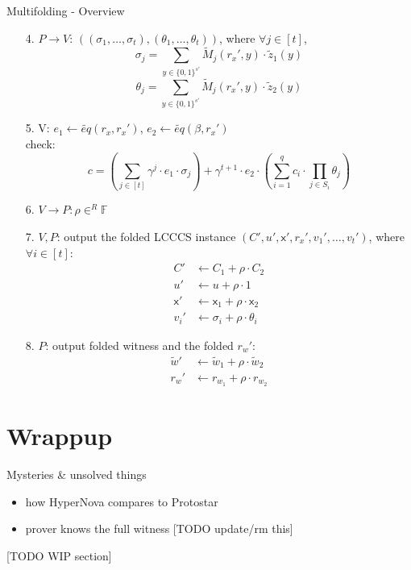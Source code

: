 \documentclass{beamer}
\begin{document}
\begin{frame}{Multifolding - Overview}

  \begin{tiny}
  \begin{enumerate}
    \item[4.] $P \rightarrow V$: $\left( (\sigma_1, \ldots, \sigma_t), (\theta_1, \ldots, \theta_t) \right)$, where $\forall j \in [t]$,
		$$\sigma_j = \sum_{y \in \{0,1\}^{s'}} \widetilde{M}_j(r_x', y) \cdot \widetilde{z}_1(y)$$
		$$\theta_j = \sum_{y \in \{0, 1\}^{s'}} \widetilde{M}_j(r_x', y) \cdot \widetilde{z}_2(y)$$
	      \item[5.] V: $e_1 \leftarrow \widetilde{eq}(r_x, r_x')$, $e_2 \leftarrow \widetilde{eq}(\beta, r_x')$\\
		check:
		$$c = \left(\sum_{j \in [t]} \gamma^j \cdot e_1 \cdot \sigma_j \right) + \gamma^{t+1} \cdot e_2 \cdot \left( \sum_{i=1}^q c_i \cdot \prod_{j \in S_i} \theta_j \right)$$
	      \item[6.] $V \rightarrow P: \rho \in^R \mathbb{F}$
	      \item[7.] $V, P$: output the folded LCCCS instance $(C', u', \mathsf{x}', r_x', v_1', \ldots, v_t')$, where $\forall i \in [t]$:
		\begin{align*}
			C' &\leftarrow C_1 + \rho \cdot C_2\\
			u' &\leftarrow u + \rho \cdot 1\\
			\mathsf{x}' &\leftarrow \mathsf{x}_1 + \rho \cdot \mathsf{x}_2\\
			v_i' &\leftarrow \sigma_i + \rho \cdot \theta_i
		\end{align*}
	      \item[8.] $P$: output folded witness and the folded $r_w'$:
		\begin{align*}
			\widetilde{w}' &\leftarrow \widetilde{w}_1 + \rho \cdot \widetilde{w}_2\\
			r_w' &\leftarrow r_{w_1} + \rho \cdot r_{w_2}
		\end{align*}
  \end{enumerate}
  \end{tiny}

\end{frame}

\section[Wrappup]{Wrappup}

\begin{frame}{Mysteries \& unsolved things}
\begin{itemize}
  \item how HyperNova compares to Protostar
  \item prover knows the full witness [TODO update/rm this]
\end{itemize}

[TODO WIP section]
\end{frame}
\end{document}
